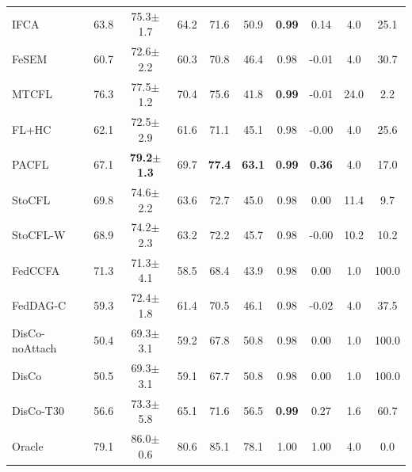 \begin{tabular}{lccccccccc}
IFCA & 63.8 & 75.3$\pm$1.7 & 64.2 & 71.6 & 50.9 & \textbf{0.99} & 0.14 & 4.0 & 25.1 \\
FeSEM & 60.7 & 72.6$\pm$2.2 & 60.3 & 70.8 & 46.4 & 0.98 & -0.01 & 4.0 & 30.7 \\
MTCFL & 76.3 & 77.5$\pm$1.2 & 70.4 & 75.6 & 41.8 & \textbf{0.99} & -0.01 & 24.0 & 2.2 \\
FL+HC & 62.1 & 72.5$\pm$2.9 & 61.6 & 71.1 & 45.1 & 0.98 & -0.00 & 4.0 & 25.6 \\
PACFL & 67.1 & \textbf{79.2$\pm$1.3} & 69.7 & \textbf{77.4} & \textbf{63.1} & \textbf{0.99} & \textbf{0.36} & 4.0 & 17.0 \\
StoCFL & 69.8 & 74.6$\pm$2.2 & 63.6 & 72.7 & 45.0 & 0.98 & 0.00 & 11.4 & 9.7 \\
StoCFL-W & 68.9 & 74.2$\pm$2.3 & 63.2 & 72.2 & 45.7 & 0.98 & -0.00 & 10.2 & 10.2 \\
FedCCFA & 71.3 & 71.3$\pm$4.1 & 58.5 & 68.4 & 43.9 & 0.98 & 0.00 & 1.0 & 100.0 \\
FedDAG-C & 59.3 & 72.4$\pm$1.8 & 61.4 & 70.5 & 46.1 & 0.98 & -0.02 & 4.0 & 37.5 \\
DisCo-noAttach & 50.4 & 69.3$\pm$3.1 & 59.2 & 67.8 & 50.8 & 0.98 & 0.00 & 1.0 & 100.0 \\
DisCo & 50.5 & 69.3$\pm$3.1 & 59.1 & 67.7 & 50.8 & 0.98 & 0.00 & 1.0 & 100.0 \\
DisCo-T30 & 56.6 & 73.3$\pm$5.8 & 65.1 & 71.6 & 56.5 & \textbf{0.99} & 0.27 & 1.6 & 60.7 \\
Oracle & 79.1 & 86.0$\pm$0.6 & 80.6 & 85.1 & 78.1 & 1.00 & 1.00 & 4.0 & 0.0 \\
\bottomrule
\end{tabular}
